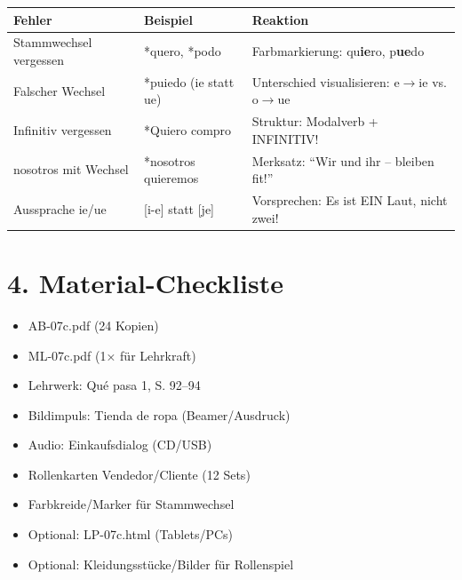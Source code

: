 \documentclass[11pt, a4paper]{article}
\begin{document}
\begin{fehlerbox}
\begin{tabularx}{\textwidth}{|l|X|X|}
\hline
\textbf{Fehler} & \textbf{Beispiel} & \textbf{Reaktion} \\
\hline
Stammwechsel vergessen & *quero, *podo & Farbmarkierung: qu\textbf{\textcolor{loesung}{ie}}ro, p\textbf{\textcolor{loesung}{ue}}do \\
\hline
Falscher Wechsel & *puiedo (ie statt ue) & Unterschied visualisieren: e$\rightarrow$ie vs. o$\rightarrow$ue \\
\hline
Infinitiv vergessen & *Quiero compro & Struktur: Modalverb + INFINITIV! \\
\hline
nosotros mit Wechsel & *nosotros quieremos & Merksatz: ``Wir und ihr -- bleiben fit!'' \\
\hline
Aussprache ie/ue & [i-e] statt [je] & Vorsprechen: Es ist EIN Laut, nicht zwei! \\
\hline
\end{tabularx}
\end{fehlerbox}


\section*{4. Material-Checkliste}

\begin{materialbox}
\begin{itemize}[label=$\square$]
    \item AB-07c.pdf (24 Kopien)
    \item ML-07c.pdf (1× für Lehrkraft)
    \item Lehrwerk: Qué pasa 1, S. 92--94
    \item Bildimpuls: Tienda de ropa (Beamer/Ausdruck)
    \item Audio: Einkaufsdialog (CD/USB)
    \item Rollenkarten Vendedor/Cliente (12 Sets)
    \item Farbkreide/Marker für Stammwechsel
    \item Optional: LP-07c.html (Tablets/PCs)
    \item Optional: Kleidungsstücke/Bilder für Rollenspiel
\end{itemize}
\end{materialbox}
\end{document}
